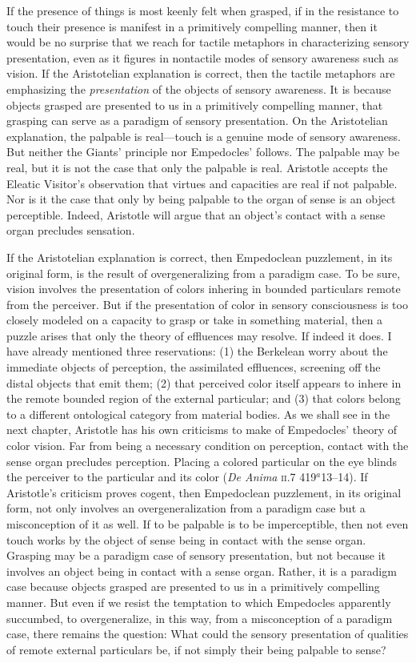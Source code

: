 If the presence of things is most keenly felt when grasped, if in the resistance to touch their presence is manifest in a primitively compelling manner, then it would be no surprise that we reach for tactile metaphors in characterizing sensory presentation, even as it figures in nontactile modes of sensory awareness such as vision. If the Aristotelian explanation is correct, then the tactile metaphors are emphasizing the \emph{presentation} of the objects of sensory awareness. It is because objects grasped are presented to us in a primitively compelling manner, that grasping can serve as a paradigm of sensory presentation. On the Aristotelian explanation, the palpable is real---touch is a genuine mode of sensory awareness. But neither the Giants' principle nor Empedocles' follows. The palpable may be real, but it is not the case that only the palpable is real. Aristotle accepts the Eleatic Visitor's observation that virtues and capacities are real if not palpable. Nor is it the case that only by being palpable to the organ of sense is an object perceptible. Indeed, Aristotle will argue that an object's contact with a sense organ precludes sensation.

If the Aristotelian explanation is correct, then Empedoclean puzzlement, in its original form,  is the result of overgeneralizing from a paradigm case. To be sure, vision involves the presentation of colors inhering in bounded particulars remote from the perceiver. But if the presentation of color in sensory consciousness is too closely modeled on a capacity to grasp or take in something material, then a puzzle arises that only the theory of effluences may resolve. If indeed it does. I have already mentioned three reservations: (1) the Berkelean worry about the immediate objects of perception, the assimilated effluences, screening off the distal objects that emit them; (2) that perceived color itself appears to inhere in the remote bounded region of the external particular; and (3) that colors belong to a different ontological category from material bodies. As we shall see in the next chapter, Aristotle has his own criticisms to make of Empedocles' theory of color vision. Far from being a necessary condition on perception, contact with the sense organ precludes perception. Placing a colored particular on the eye blinds the perceiver to the particular and its color (\emph{De Anima} \textsc{ii}.7 419\( ^{a} \)13--14). If Aristotle's criticism proves cogent, then Empedoclean puzzlement, in its original form, not only involves an overgeneralization from a paradigm case but a misconception of it as well. If to be palpable is to be imperceptible, then not even touch works by the object of sense being in contact with the sense organ. Grasping may be a paradigm case of sensory presentation, but not because it involves an object being in contact with a sense organ. Rather, it is a paradigm case because objects grasped are presented to us in a primitively compelling manner. But even if we resist the temptation to which Empedocles apparently succumbed, to overgeneralize, in this way, from a misconception of a paradigm case, there remains the question: What could the sensory presentation of qualities of remote external particulars be, if not simply their being palpable to sense?

